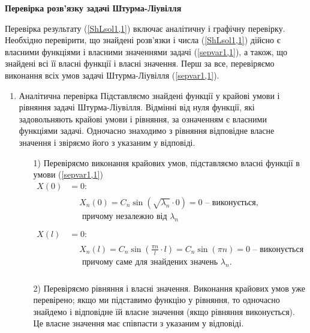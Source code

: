 \begin{center}
    \large{\textbf{Перевірка розв'язку задачі Штурма-Ліувілля}}
\end{center}

\noindent Перевірка результату (\ref{ShLsol1,1}) включає аналітичну і графічну перевірку. Необхідно перевірити, що знайдені розв'язки і числа (\ref{ShLsol1,1}) дійсно є власними функціями і власними значеннями задачі (\ref{sepvar1,1}), а також, що знайдені всі її власні функції і власні значення. Перш за все, перевіряємо виконання всіх умов задачі Штурма-Ліувілля (\ref{sepvar1,1}).
\begin{enumerate}[wide, labelindent=0pt]
    \item Аналітична перевірка 
    Підставляємо знайдені функції у крайові умови і рівняння задачі Штурма-Ліувілля. Відмінні від нуля функції, які задовольняють крайові умови і рівняння, за означенням є власними функціями задачі. Одночасно знаходимо з рівняння відповідне власне значення і звіряємо його з указаним у відповіді.
    \begin{enumerate}
        \item[1)] Перевіряємо виконання крайових умов, підставляємо власні функції в умови (\ref{sepvar1,1}) 
        \begin{equation*}
            \begin{aligned}
                X(0) &=  0:\\
                &\begin{aligned}
                    &X_n(0) = C_n \sin(\sqrt{\lambda_n} \cdot 0) = 0 \text{ -- виконується,}\\
                    &\text{ причому незалежно від }\lambda_n
                \end{aligned}\\
                \\
                X(l) &= 0:\\
                &\begin{aligned}
                    &X_n(l) = C_n \sin\left(\frac{\pi n}{l} \cdot l\right) = C_n \sin(\pi n) = 0 \text{ -- виконується}\\
                    &\text{ причому саме для знайдених значень }\lambda_n.
                \end{aligned}\\
            \end{aligned}
        \end{equation*}
        \item[2)] Перевіряємо рівняння і власні значення. Виконання крайових умов уже перевірено; якщо ми підставимо функцію у рівняння, то одночасно знайдемо і відповідне їй власне значення (якщо рівняння виконується). Це власне значення має співпасти з указаним у відповіді. 
        

\end{enumerate}
\end{enumerate}
